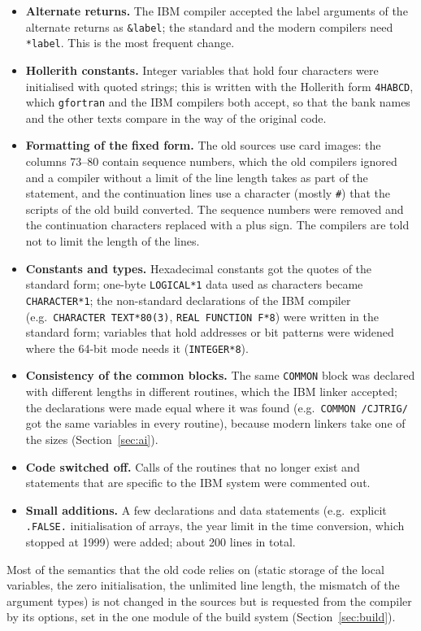 \begin{itemize}
\item \textbf{Alternate returns.} The IBM compiler accepted the label arguments of the alternate returns as \texttt{\&label}; the
standard and the modern compilers need \texttt{*label}. This is the most frequent change.
\item \textbf{Hollerith constants.} Integer variables that hold four characters were initialised with quoted strings; this
is written with the Hollerith form \texttt{4HABCD}, which \texttt{gfortran} and the IBM compilers both accept, so that the
bank names and the other texts compare in the way of the original code.
\item \textbf{Formatting of the fixed form.} The old sources use card images: the columns 73--80 contain sequence numbers, which
the old compilers ignored and a compiler without a limit of the line length takes as part of the statement, and the continuation lines use a character (mostly \texttt{\#}) that the scripts of the old build converted. The sequence numbers were removed and the continuation characters replaced
with a plus sign. The compilers are told not to limit the length of the lines.
\item \textbf{Constants and types.} Hexadecimal constants got the quotes of the standard form; one-byte \texttt{LOGICAL*1} data
used as characters became \texttt{CHARACTER*1}; the non-standard declarations of the IBM compiler (e.g.\
\texttt{CHARACTER TEXT*80(3)}, \texttt{REAL FUNCTION F*8}) were written in the standard form; variables that hold addresses
or bit patterns were widened where the 64-bit mode needs it (\texttt{INTEGER*8}).
\item \textbf{Consistency of the common blocks.} The same \texttt{COMMON} block was declared with different lengths in
different routines, which the IBM linker accepted; the declarations were made equal where it was found
(e.g.\ \texttt{COMMON /\allowbreak{}CJTRIG/\allowbreak{}} got the same variables in every routine), because modern linkers take one of the sizes
(Section~\ref{sec:ai}).
\item \textbf{Code switched off.} Calls of the routines that no longer exist and statements that are specific to the IBM
system were commented out.
\item \textbf{Small additions.} A few declarations and data statements (e.g.\ explicit \texttt{.FALSE.} initialisation of
arrays, the year limit in the time conversion, which stopped at 1999) were added; about 200 lines in total.
\end{itemize}
Most of the semantics that the old code relies on (static storage of the local variables, the zero initialisation, the unlimited
line length, the mismatch of the argument types) is not changed in the sources but is requested from the compiler by its
options, set in the one module of the build system (Section~\ref{sec:build}).

